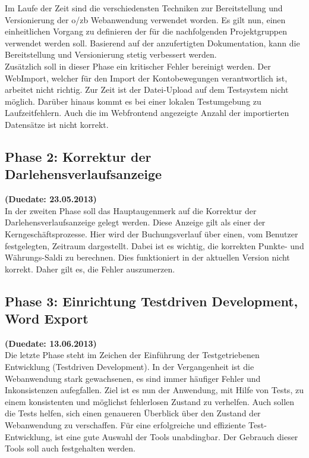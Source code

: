 \documentclass[12pt,             %
               a4paper,          %
               listof=totoc,     %
               index=totoc,      %
               bibliography=totoc,%
               oneside,         %
               BCOR1cm,          %
               english   %
               ]{scrbook}
\begin{document}
Im Laufe der Zeit sind die verschiedensten Techniken zur Bereitstellung und Versionierung der o/zb Webanwendung verwendet worden. Es gilt nun, einen einheitlichen Vorgang zu definieren der für die nachfolgenden Projektgruppen verwendet werden soll. Basierend auf der anzufertigten Dokumentation, kann die Bereitstellung und Versionierung stetig verbessert werden.\\

Zusätzlich soll in dieser Phase ein kritischer Fehler bereinigt werden. Der WebImport, welcher für den Import der Kontobewegungen verantwortlich ist, arbeitet nicht richtig. Zur Zeit ist der Datei-Upload auf dem Testsystem nicht möglich. Darüber hinaus kommt es bei einer lokalen Testumgebung zu Laufzeitfehlern. Auch die im Webfrontend angezeigte Anzahl der importierten Datensätze ist nicht korrekt.

\subsection{Phase 2: Korrektur der Darlehensverlaufsanzeige}
\textbf {(Duedate: 23.05.2013)}\\
In der zweiten Phase soll das Hauptaugenmerk auf die Korrektur der Darlehensverlaufsanzeige gelegt werden. Diese Anzeige gilt als einer der Kerngeschäftsprozesse. Hier wird der Buchungsverlauf über einen, vom Benutzer festgelegten, Zeitraum dargestellt. Dabei ist es wichtig, die korrekten Punkte- und Währungs-Saldi zu berechnen. Dies funktioniert in der aktuellen Version nicht korrekt. Daher gilt es, die Fehler auszumerzen.  


\subsection{Phase 3: Einrichtung Testdriven Development, Word Export}
\textbf {(Duedate: 13.06.2013)}\\

Die letzte Phase steht im Zeichen der Einführung der Testgetriebenen Entwicklung (\glqq Testdriven Development\grqq). In der Vergangenheit ist die Webanwendung stark gewachsenen, es sind immer häufiger Fehler und Inkonsistenzen aufegfallen. Ziel ist es nun der Anwendung, mit Hilfe von Tests, zu einem konsistenten und möglichst fehlerlosen Zustand zu verhelfen. Auch sollen die Tests helfen, sich einen genaueren Überblick über den Zustand der Webanwendung zu verschaffen. Für eine erfolgreiche und effiziente Test-Entwicklung, ist eine gute Auswahl der Tools unabdingbar. Der Gebrauch dieser Tools soll auch festgehalten werden.
\end{document}
